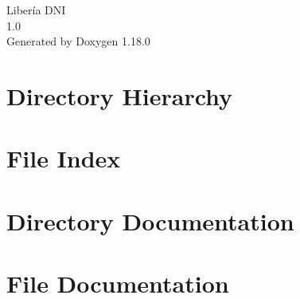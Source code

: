 \documentclass[twoside]{book}
\newcommand{\+}{\discretionary{\mbox{\scriptsize$\hookleftarrow$}}{}{}}
\newcommand{\clearemptydoublepage}{%
    \newpage{\pagestyle{empty}\cleardoublepage}%
  }
\begin{document}
  \raggedbottom
    \hypersetup{pageanchor=false,
                bookmarksnumbered=true,
                pdfencoding=unicode
               }
  \begin{titlepage}
  \vspace*{7cm}
  \begin{center}%
  {\Large Libería DNI}\\
  [1ex]\large 1.\+0 \\
  \vspace*{1cm}
  {\large Generated by Doxygen 1.18.0}\\
  \end{center}
  \end{titlepage}
  \clearemptydoublepage
  \tableofcontents
  \clearemptydoublepage
  \hypersetup{pageanchor=true}
\chapter{Directory Hierarchy}

\chapter{File Index}

\chapter{Directory Documentation}

\chapter{File Documentation}



  \backmatter
  \newpage
  \clearemptydoublepage
  \printindex
\end{document}
